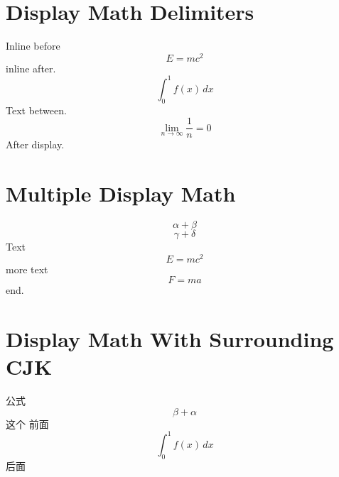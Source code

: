 \documentclass{article}
\begin{document}
\section{Display Math Delimiters}
Inline before $$E = mc^2$$ inline after.
\[ \int_0^1 f(x) \, dx \]
Text between.
\[ \lim_{n \to \infty} \frac{1}{n} = 0 \]
After display.

\section{Multiple Display Math}
 $$\alpha + \beta$$  $$\gamma + \delta$$ Text $$E=mc^2$$ more text $$F=ma$$ end.

\section{Display Math With Surrounding CJK}
公式$$\beta+\alpha$$这个
前面$$\int_0^1 f(x)\,dx$$后面
\end{document}
